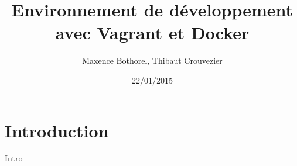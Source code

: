 \documentclass{beamer}
\title{Environnement de développement avec Vagrant et Docker}
\author{Maxence Bothorel, Thibaut Crouvezier}
\institute{Licence professionnelle ASRALL,\\
	IUT Nancy Charlemagne,\\
	Nancy}
\date{22/01/2015}
\begin{document}
	\begin{frame}
		\maketitle{}
	\end{frame}
	
	\section{Introduction}
	
	\begin{frame}
		Intro
	\end{frame}
\end{document}
